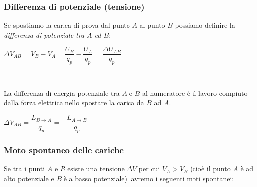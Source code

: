 \documentclass[handout]{beamer}
\theoremstyle{plain}
\begin{document}
\begin{frame}
\frametitle{Differenza di potenziale (tensione)}

Se spostiamo la carica di prova dal punto $ A $ al punto $ B $ possiamo definire la \emph{differenza di potenziale tra $ A $ ed $ B $}:
\begin{center}
$ \Delta V_{AB} = V_B - V_A = \dfrac{U_B}{q_p} - \dfrac{U_A}{q_p} = \dfrac{\Delta U_{AB}}{q_p}$
\end{center}\pause

~

\alert{La differenza di energia potenziale} tra $ A $ e $ B $ al numeratore \alert{è il lavoro compiuto dalla forza elettrica} nello spostare la carica da $ B $ ad $ A $.
\begin{center}
\colorbox{blue!30}{$ \Delta V_{AB} = \dfrac{L_{B \to A}}{q_p} = -\dfrac{L_{A \to B}}{q_p} $}
\end{center}
\end{frame}








\begin{frame}
\frametitle{Moto spontaneo delle cariche}
Se tra i punti $ A $ e $ B $ esiste una tensione $ \Delta V $ per cui \alert{$ V_A > V_B $} (cioè il punto $ A $ è ad alto potenziale e $ B $ è a basso potenziale), avremo i seguenti moti spontanei:
\begin{figure}
\end{figure}
\end{frame}
\end{document}
